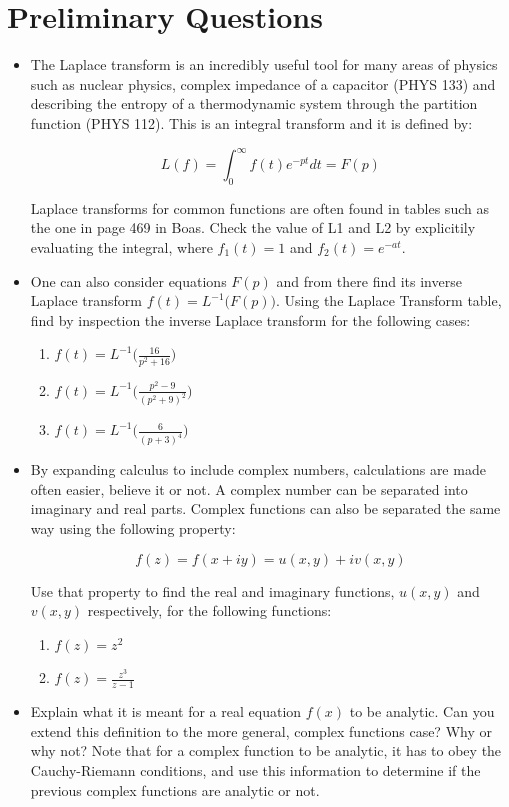 \documentclass{article}
\begin{document}
\section{Preliminary Questions}
 \begin{itemize}
  \item The Laplace transform is an incredibly useful tool for many areas of physics such as nuclear physics, complex impedance of a capacitor (PHYS 133) and describing the entropy of a thermodynamic system through the partition function (PHYS 112). This is an integral transform and it is defined by:
  
  \begin{equation}
      L(f)=\int_{0}^{\infty}f(t)e^{-pt}dt=F(p)
  \end{equation}
  
  Laplace transforms for common functions are often found in tables such as the one in page 469 in Boas. Check the value of L1 and L2 by explicitily evaluating the integral, where $f_{1}(t)=1$ and $f_{2}(t)=e^{-at}$.
  \item One can also consider equations $F(p)$ and from there find its inverse Laplace transform $f(t)=L^{-1}\Big(F(p)\Big)$. Using the Laplace Transform table, find by inspection the inverse Laplace transform for the following cases:
  
  \begin{enumerate}
      \item $f(t)=L^{-1}\Big(\frac{16}{p^2+16}\Big)$
      \item $f(t)=L^{-1}\Big(\frac{p^2-9}{(p^2+9)^2}\Big)$
      \item $f(t)=L^{-1}\Big(\frac{6}{(p+3)^4}\Big)$
  \end{enumerate}
    \item By expanding calculus to include complex numbers, calculations are made often easier, believe it or not. A complex number can be separated into imaginary and real parts. Complex functions can also be separated the same way using the following property:
  
 \begin{equation}
     f(z)=f(x+iy)=u(x,y)+iv(x,y)
 \end{equation}
 
 Use that property to find the real and imaginary functions, $u(x,y)$ and $v(x,y)$ respectively, for the following functions:
 
 \begin{enumerate}
     \item $f(z)=z^2$
     \item $f(z)=\frac{z^3}{z-1}$
 \end{enumerate}
  \item Explain what it is meant for a real equation $f(x)$ to be analytic. Can you extend this definition to the more general, complex functions case? Why or why not? Note that for a complex function to be analytic, it has to obey the Cauchy-Riemann conditions, and use this information to determine if the previous complex functions are analytic or not.
  

\end{itemize}
\end{document}
